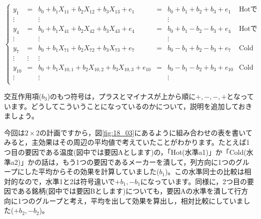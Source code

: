 \documentclass{ltjbook}
\begin{document}
\begin{equation}
	\label{eq18_04}
	\left\{
	\begin{array}{cccccc}
		y_1    & =      & b_0 + b_1 X_{11} + b_2 X_{12} + b_3 X_{13}+ e_1          & = & b_0 + b_1 + b_2  + b_3 + e_1   & \mbox{Hotで銘柄A}  \\
		\vdots &        & \vdots                                                   &   & \vdots                                           \\
		y_4    & =      & b_0 + b_1 X_{41} + b_2 X_{42} + b_3 X_{43}+ e_4          & = & b_0 + b_1 - b_2 - b_3 + e_4    & \mbox{Hotで銘柄B}  \\
		\vdots &        & \vdots                                                   &   & \vdots                                           \\
		y_7    & =      & b_0 + b_1 X_{71} + b_2 X_{72} + b_3 X_{73}+ e_7          & = & b_0 - b_1 + b_2 - b_3 + e_7    & \mbox{Coldで銘柄A} \\
		\vdots & \vdots & \vdots                                                                                                          \\
		y_{10} & =      & b_0 + b_1 X_{10,1} + b_2 X_{10,2} + b_3 X_{10,3}+ e_{10} & = & b_0 - b_1 - b_2+ b_3  + e_{10} & \mbox{Coldで銘柄B} \\
		\vdots &        & \vdots                                                   &   & \vdots                         &                 \\
	\end{array}
	\right .
\end{equation}

交互作用項($b_3$)のもつ符号は，プラスとマイナスが上から順に$+,-,-,+$となっています。どうしてこういうことになっているのかについて，説明を追加しておきましょう。

今回は$2\times2$の計画ですから，図\ref{fig:18_03}にあるように組み合わせの表を書いてみると，主効果はその周辺の平均値で考えていたことがわかります。たとえば1つ目の要因である温度(図中では要因Aとします)の，「Hot(水準a1)」か「Cold(水準a2)」かの話は，もう1つの要因であるメーカーを潰して，列方向に1つのグループにした平均からその効果を計算していました($b_1$)。この水準同士の比較は相対的なので，水準1と2は符号違いで$+b_1,-b_1$になっています。同様に，2つ目の要因である銘柄(図中では要因Bとします)についても，要因Aの水準を潰して行方向に1つのグループと考え，平均を出して効果を算出し，相対比較にしていました($+b_2,-b_2$)。
\end{document}
